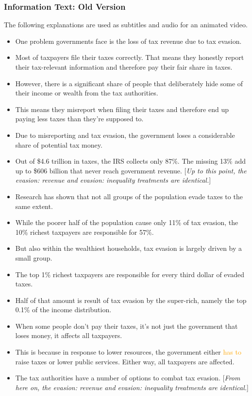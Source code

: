 \documentclass[11pt]{article}
\newcommand{\tk}[1]{\textcolor{orange}{#1}}
\begin{document}
\subsubsection*{Information Text: Old Version}
The following explanations are used as subtitles and audio for an animated video.
\begin{itemize}
\item One problem governments face is the loss of tax revenue due to tax evasion.  
\item Most of taxpayers file their taxes correctly. That means they honestly report their tax-relevant information and therefore pay their fair share in taxes. 
\item However, there is a significant share of people that deliberately hide some of their income or wealth from the tax authorities. 
\item This means they misreport when filing their taxes and therefore end up paying less taxes than they're supposed to. 
\item Due to misreporting and tax evasion, the government loses a considerable share of potential tax money. 
\item Out of \$4.6 trillion in taxes, the IRS collects only 87\%. The missing 13\% add up to \$606 billion that never reach government revenue. [\textit{Up to this point, the evasion: revenue and evasion: inequality treatments are identical.}]
\item Research has shown that not all groups of the population evade taxes to the same extent. 
\item While the poorer half of the population cause only 11\% of tax evasion, the 10\% richest taxpayers are responsible for 57\%. 
\item But also within the wealthiest households, tax evasion is largely driven by a small group. 
\item The top 1\% richest taxpayers are responsible for every third dollar of evaded taxes.  
\item Half of that amount is result of tax evasion by the super-rich, namely the top 0.1\% of the income distribution. 
\item When some people don't pay their taxes, it's not just the government that loses money, it affects all taxpayers. 
\item This is because in response to lower resources, the government either \tk{has to} raise taxes or lower public services. Either way, all taxpayers are affected. 
\item The tax authorities have a number of options to combat tax evasion. [\textit{From here on, the evasion: revenue and evasion: inequality treatments are identical.}]

\end{itemize}
\end{document}
